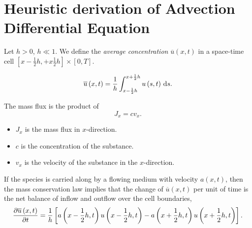 \section{Heuristic derivation of Advection Differential Equation}

\begin{frame}
    \begin{definition}
        Let $h>0$, $h\ll 1$.
        We define the \emph{average concentration}
        $\overline{u}\left(x,t\right)$ in a space-time cell
        \begin{math}
            \left[
                x-\frac{1}{2}h,
                +x\frac{1}{2}h
                \right]\times
            \left[0,T\right]
        \end{math}.

        \begin{equation*}
            \overline{u}
            \left(x,t\right)=
            \dfrac{1}{h}
            \int_{x-\frac{1}{2}h}^{x+\frac{1}{2}h}
            u\left(s,t\right)
            \dl s.
        \end{equation*}
    \end{definition}

    \begin{definition}
        The mass flux is the product of
        \begin{equation*}
            J_{x}=
            c
            v_{x}.
        \end{equation*}
        \begin{itemize}
            \item

                  $J_{x}$ is the mass flux in $x$-direction.

            \item

                  $c$ is the concentration of the substance.

            \item

                  $v_{x}$ is the velocity of the substance in the
                  $x$-direction.
        \end{itemize}
    \end{definition}

    \begin{theorem}
        If the species is carried along by a flowing medium with
        velocity $a\left(x,t\right)$, then the mass conservation law
        implies that the change of $\overline{u}\left(x,t\right)$ per
        unit of time is the net balance of inflow and outflow over
        the cell boundaries,
        \begin{equation*}
            \diffp{\overline{u}\left(x,t\right)}{t}=
            \dfrac{1}{h}
            \left[
                a\left(x-\frac{1}{2}h,t\right)
                u\left(x-\frac{1}{2}h,t\right)-
                a\left(x+\frac{1}{2}h,t\right)
                u\left(x+\frac{1}{2}h,t\right)
                \right].
        \end{equation*}
    \end{theorem}
\end{frame}

